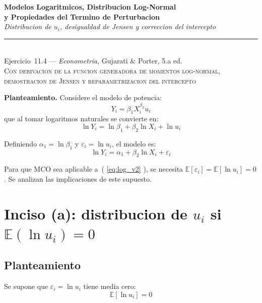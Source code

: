 \documentclass[12pt, letterpaper]{article}
\theoremstyle{remark}
\newcommand{\E}{\mathbb{E}}
\begin{document}
\begin{center}
  {\LARGE\bfseries Modelos Logaritmicos, Distribucion Log-Normal}\\[6pt]
  {\LARGE\bfseries y Propiedades del Termino de Perturbacion}\\[12pt]
  {\large\itshape Distribucion de $u_i$, desigualdad de Jensen y correccion del intercepto}\\[14pt]
  \rule{0.55\linewidth}{0.6pt}\\[8pt]
  {\normalsize Ejercicio~11.4 --- \textit{Econometria}, Gujarati \& Porter, 5.a ed.}\\[4pt]
  {\small\textsc{Con derivacion de la funcion generadora de momentos log-normal,
  demostracion de Jensen y reparametrizacion del intercepto}}
\end{center}

\vspace{10pt}

\noindent\textbf{Planteamiento.}\quad
Considere el modelo de potencia:
\begin{equation}
  Y_i = \beta_1 X_i^{\beta_2} u_i
  \tag{1}\label{eq:nivel}
\end{equation}
que al tomar logaritmos naturales se convierte en:
\begin{equation}
  \ln Y_i = \ln\beta_1 + \beta_2 \ln X_i + \ln u_i
  \tag{2}\label{eq:log}
\end{equation}

Definiendo $\alpha_1 = \ln\beta_1$ y $\varepsilon_i = \ln u_i$, el modelo es:
\begin{equation}
  \ln Y_i = \alpha_1 + \beta_2 \ln X_i + \varepsilon_i
  \label{eq:log_v2}
\end{equation}

Para que MCO sea aplicable a~( \ref{eq:log_v2} ), se necesita $\E[\varepsilon_i] = \E[\ln u_i] = 0$.
Se analizan las implicaciones de este supuesto.

\section{Inciso (a): distribucion de $u_i$ si $\E(\ln u_i) = 0$}

\subsection{Planteamiento}

Se supone que $\varepsilon_i = \ln u_i$ tiene media cero:
\begin{equation}
  \E[\ln u_i] = 0
  \label{eq:cond_a}
\end{equation}
\end{document}
